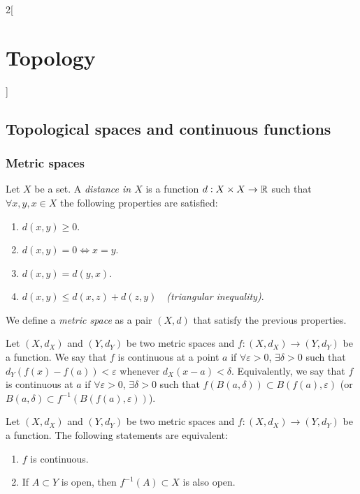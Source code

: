 \documentclass[../../../main.tex]{subfiles}
\begin{document}
\begin{multicols}{2}[\section{Topology}]
  \subsection{Topological spaces and continuous functions}
  \subsubsection*{Metric spaces}
  \begin{definition}
    Let $X$ be a set. A \textit{distance in $X$} is a function $d:X\times X\rightarrow\mathbb{R} $ such that $\forall x,y,x\in X$ the following properties are satisfied:
    \begin{enumerate}
      \item $d(x,y)\geq 0$.
      \item $d(x,y)=0\iff x=y$.
      \item $d(x,y)=d(y,x)$.
      \item $d(x,y)\leq d(x,z)+d(z,y)\quad$\textit{(triangular inequality)}.
    \end{enumerate}
    We define a \textit{metric space} as a pair $(X,d)$ that satisfy the previous properties.
  \end{definition}
  \begin{definition}
    Let $(X,d_X)$ and $(Y,d_Y)$ be two metric spaces and $f:(X,d_X)\rightarrow(Y,d_Y)$ be a function. We say that $f$ is continuous at a point $a$ if $\forall\varepsilon>0$, $\exists\delta>0$ such that $d_Y(f(x)-f(a))<\varepsilon$ whenever $d_X(x-a)<\delta$. Equivalently, we say that $f$ is continuous at $a$ if $\forall\varepsilon>0$, $\exists\delta>0$ such that $f(B(a,\delta))\subset B(f(a),\varepsilon)$ (or $B(a,\delta)\subset f^{-1}\left(B(f(a),\varepsilon)\right)$).
  \end{definition}
  \begin{theorem}
    Let $(X,d_X)$ and $(Y,d_Y)$ be two metric spaces and $f:(X,d_X)\rightarrow(Y,d_Y)$ be a function. The following statements are equivalent:
    \begin{enumerate}
      \item $f$ is continuous.
      \item If $A\subset Y$ is open, then $f^{-1}(A)\subset X$ is also open.
    \end{enumerate}
  \end{theorem}

\end{multicols}
\end{document}
